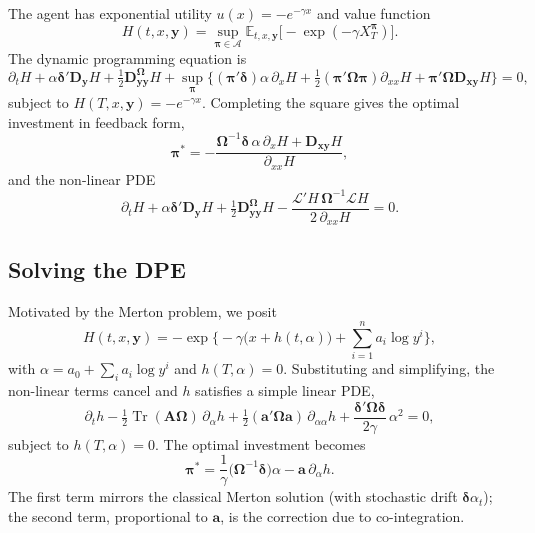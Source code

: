 \documentclass[11pt]{article}
\newcommand{\E}{\mathbb{E}}
\DeclareMathOperator{\Tr}{Tr}
\DeclareMathOperator*{\supop}{sup}
\begin{document}
The agent has exponential utility $u(x) = -e^{-\gamma x}$ and value function
\begin{equation*}
  H(t,x,\bm y) = \supop_{\bm\pi\in\mathcal A}\E_{t,x,\bm y}\big[-\exp(-\gamma X^{\bm\pi}_T)\big].
\end{equation*}
The dynamic programming equation is
\begin{equation}
  \partial_t H + \alpha\bm\delta'\bm D_{\bm y}H + \tfrac12 \bm D^{\bm\Omega}_{\bm{yy}}H
    + \supop_{\bm\pi}\Big\{(\bm\pi'\bm\delta)\alpha\,\partial_x H
    + \tfrac12(\bm\pi'\bm\Omega\bm\pi)\partial_{xx}H + \bm\pi'\bm\Omega\bm D_{\bm{xy}}H\Big\} = 0,
\end{equation}
subject to $H(T,x,\bm y) = -e^{-\gamma x}$. Completing the square gives the optimal investment in
feedback form,
\begin{equation}\label{eq:117}
  \bm\pi^* = -\frac{\bm\Omega^{-1}\bm\delta\,\alpha\,\partial_x H + \bm D_{\bm{xy}}H}{\partial_{xx}H}, \tag{11.7}
\end{equation}
and the non-linear PDE
\begin{equation}\label{eq:118}
  \partial_t H + \alpha\bm\delta'\bm D_{\bm y}H + \tfrac12 \bm D^{\bm\Omega}_{\bm{yy}}H
    - \frac{\mathcal{L}'H\,\bm\Omega^{-1}\mathcal{L}H}{2\,\partial_{xx}H} = 0. \tag{11.8}
\end{equation}

\subsection{Solving the DPE}

Motivated by the Merton problem, we posit
\begin{equation}
  H(t,x,\bm y) = -\exp\Big\{-\gamma\big(x + h(t,\alpha)\big) + \sum_{i=1}^n a_i \log y^i\Big\},
\end{equation}
with $\alpha = a_0 + \sum_i a_i \log y^i$ and $h(T,\alpha)=0$. Substituting and simplifying, the
non-linear terms cancel and $h$ satisfies a simple linear PDE,
\begin{equation}\label{eq:1110}
  \partial_t h - \tfrac12\Tr(\bm A\bm\Omega)\,\partial_\alpha h + \tfrac12(\bm a'\bm\Omega\bm a)\,
    \partial_{\alpha\alpha}h + \frac{\bm\delta'\bm\Omega\bm\delta}{2\gamma}\,\alpha^2 = 0, \tag{11.10}
\end{equation}
subject to $h(T,\alpha)=0$. The optimal investment becomes
\begin{equation}\label{eq:1111}
  \bm\pi^* = \frac1\gamma\big(\bm\Omega^{-1}\bm\delta\big)\alpha - \bm a\,\partial_\alpha h. \tag{11.11}
\end{equation}
The first term mirrors the classical Merton solution (with stochastic drift $\bm\delta\alpha_t$); the
second term, proportional to $\bm a$, is the correction due to co-integration.
\end{document}

